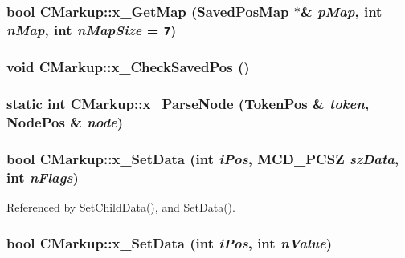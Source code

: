 \subsubsection[x\_\-GetMap]{\setlength{\rightskip}{0pt plus 5cm}bool CMarkup::x\_\-GetMap ({\bf SavedPosMap} $\ast$\& {\em pMap}, \/  int {\em nMap}, \/  int {\em nMapSize} = {\tt 7})\hspace{0.3cm}{\tt  [protected]}}\label{classCMarkup_59332dee2e4c9f69b49412f0fad6874a}


\subsubsection[x\_\-CheckSavedPos]{\setlength{\rightskip}{0pt plus 5cm}void CMarkup::x\_\-CheckSavedPos ()\hspace{0.3cm}{\tt  [protected]}}\label{classCMarkup_30aa7b46d2e888309de99dae0b186f88}


\subsubsection[x\_\-ParseNode]{\setlength{\rightskip}{0pt plus 5cm}static int CMarkup::x\_\-ParseNode ({\bf TokenPos} \& {\em token}, \/  {\bf NodePos} \& {\em node})\hspace{0.3cm}{\tt  [static, protected]}}\label{classCMarkup_0d02b41058d6949dd83496d20532e7b3}


\subsubsection[x\_\-SetData]{\setlength{\rightskip}{0pt plus 5cm}bool CMarkup::x\_\-SetData (int {\em iPos}, \/  MCD\_\-PCSZ {\em szData}, \/  int {\em nFlags})\hspace{0.3cm}{\tt  [protected]}}\label{classCMarkup_e55b7533359dd64e5528f4ab31ef6912}




Referenced by SetChildData(), and SetData().
\subsubsection[x\_\-SetData]{\setlength{\rightskip}{0pt plus 5cm}bool CMarkup::x\_\-SetData (int {\em iPos}, \/  int {\em nValue})\hspace{0.3cm}{\tt  [protected]}}\label{classCMarkup_a755a1437e59c3c491076344509d6b0e}


